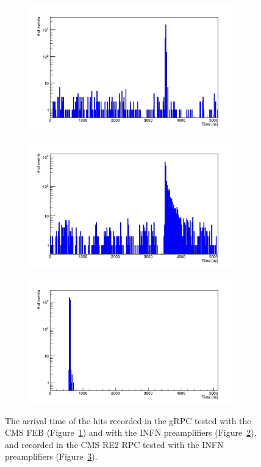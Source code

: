     \begin{figure}[H]
		\begin{subfigure}{.5\linewidth}
		    \centering
			\includegraphics[width=\linewidth]{fig/chapt6/Muon-Time-Profile-gRPC-CMS-FEB.pdf}
			\caption{\label{fig:time-profiles:A}}
		\end{subfigure}
		\begin{subfigure}{.5\linewidth}
		    \centering
			\includegraphics[width = \linewidth]{fig/chapt6/Muon-Time-Profile-gRPC-INFN.pdf}
			\caption{\label{fig:time-profiles:B}}
		\end{subfigure}
		\begin{subfigure}{\linewidth}
		    \centering
			\includegraphics[width = .5\linewidth]{fig/chapt6/Muon-Time-Profile-RE4-INFN.pdf}
			\caption{\label{fig:time-profiles:C}}
		\end{subfigure}
		\caption{\label{fig:time-profiles} The arrival time of the hits recorded in the gRPC tested with the CMS FEB (Figure~\ref{fig:time-profiles:A}) and with the INFN preamplifiers (Figure~\ref{fig:time-profiles:B}), and recorded in the CMS RE2 RPC tested with the INFN preamplifiers (Figure~\ref{fig:time-profiles:C}).}
	\end{figure}

